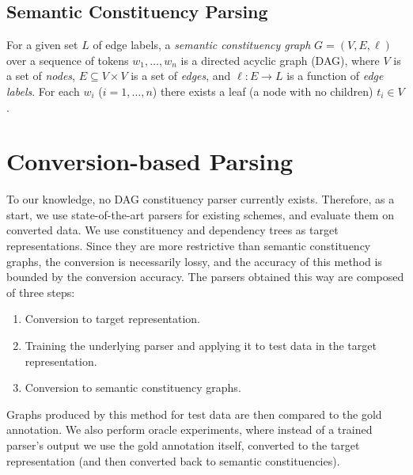 \documentclass[11pt]{article}
\begin{document}




\subsection{Semantic Constituency Parsing}

For a given set $L$ of edge labels, a \textit{semantic constituency graph} $G=(V,E, \ell)$ over a sequence of tokens $w_1, \ldots, w_n$ is a directed acyclic graph (DAG), where $V$ is a set of \textit{nodes}, $E \subseteq V\times V$ is a set of \textit{edges}, and $\ell:E\to L$ is a function of \textit{edge labels}. For each $w_i$ ($i=1, \ldots, n$) there exists a leaf (a node with no children) $t_i \in V$.


\section{Conversion-based Parsing}\label{sec:conversion_approach}

To our knowledge, no DAG constituency parser currently exists. Therefore, as a start, we use state-of-the-art parsers for existing schemes, and evaluate them on converted data. We use constituency and dependency trees as target representations. Since they are more restrictive than semantic constituency graphs, the conversion is necessarily lossy, and the accuracy of this method is bounded by the conversion accuracy.
The parsers obtained this way are composed of three steps:
\begin{enumerate}
\item Conversion to target representation.
\item Training the underlying parser and applying it to test data in the target representation.
\item Conversion to semantic constituency graphs.
\end{enumerate}
Graphs produced by this method for test data are then compared to the gold annotation.
We also perform oracle experiments, where instead of a trained parser's output we use the gold annotation itself, converted to the target representation (and then converted back to semantic constituencies).
\end{document}
